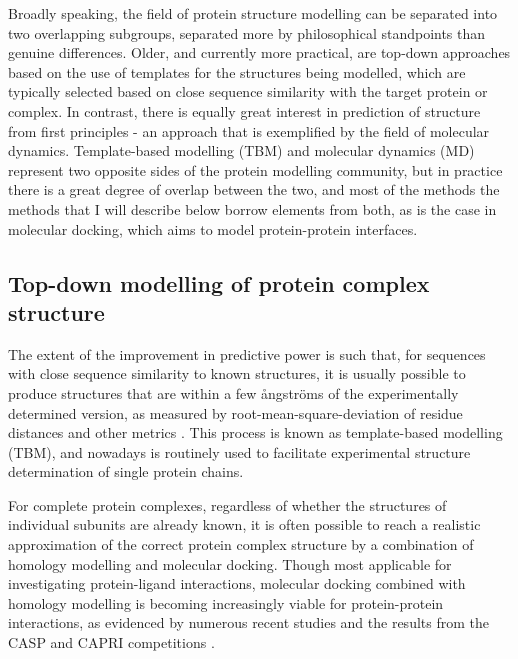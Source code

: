 \documentclass[a4paper,11pt,twoside,openright]{scrbook}
\begin{document}
Broadly speaking, the field of protein structure modelling can be separated into two overlapping subgroups, separated more by philosophical standpoints than genuine differences. Older, and currently more practical, are top-down approaches based on the use of templates for the structures being modelled,  which are typically selected based on close sequence similarity with the target protein or complex. In contrast, there is equally great interest in prediction of structure from first principles - an approach that is exemplified by the field of molecular dynamics. Template-based modelling (TBM) and molecular dynamics (MD) represent two opposite sides of the protein modelling community, but in practice there is a great degree of overlap between the two, and most of the methods the methods that I will describe below borrow elements from both, as is the case in molecular docking, which aims to model protein-protein interfaces.
%

\subsection{Top-down modelling of protein complex structure}
The extent of the improvement in predictive power is such that, for sequences with close sequence similarity to known structures, it is usually possible to produce structures that are within a few ångströms of the experimentally determined version, as measured by root-mean-square-deviation of residue distances and other metrics \cite{Haas2013,Moult2016}. This process is known as template-based modelling (TBM), and nowadays is routinely used to facilitate experimental structure determination of single protein chains.

For complete protein complexes, regardless of whether the structures of individual subunits are already known, it is often possible to reach a realistic approximation of the correct protein complex structure by a combination of homology modelling and molecular docking. Though most applicable for investigating protein-ligand interactions, molecular docking combined with homology modelling is becoming increasingly viable for protein-protein interactions, as evidenced by numerous recent studies and the results from the CASP and CAPRI competitions \cite{Jiang2013,Rajapaksha2014,Agostino2016,Lensink2016}.
\end{document}
